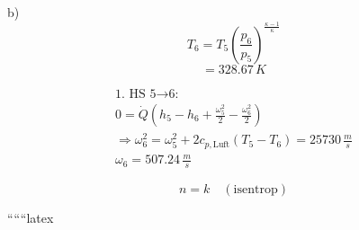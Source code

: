 b) 
\[
T_6 = T_5 \left( \frac{p_6}{p_5} \right)^{\frac{\kappa - 1}{\kappa}}
\]
\[
= 328.67 \, K
\]

\[
\begin{array}{l}
\text{1. HS 5} \rightarrow \text{6:} \\
0 = \dot{Q} (h_5 - h_6 + \frac{\omega_5^2}{2} - \frac{\omega_6^2}{2}) \\
\Rightarrow \omega_6^2 = \omega_5^2 + 2 c_{p, \text{Luft}} (T_5 - T_6) = 25730 \, \frac{m}{s} \\
\omega_6 = 507.24 \, \frac{m}{s}
\end{array}
\]

\[
n = k \quad (\text{isentrop})
\]

``````latex